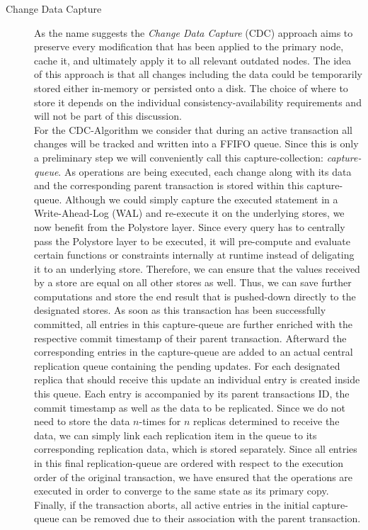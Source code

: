 \begin{description}
    \item [Change Data Capture]
     As the name suggests the \emph{Change Data Capture} (CDC) approach aims to preserve every modification that has been applied to the primary node, cache it, and ultimately
    apply it to all relevant outdated nodes. 
    The idea of this approach is that all changes including the data could be temporarily stored either in-memory or persisted onto a disk.
    The choice of where to store it depends on the individual consistency-availability requirements and will not be part of this discussion.\\
    For the CDC-Algorithm we consider that during an active transaction all changes will be tracked and written into a FFIFO queue.
    Since this is only a preliminary step we will conveniently call this capture-collection: \emph{capture-queue}.
    As operations are being executed, each change along with its data and the corresponding parent transaction is stored within this capture-queue.
    Although we could simply capture the executed statement in a Write-Ahead-Log (WAL) and re-execute it on the underlying stores, we now benefit from the Polystore layer.
    Since every query has to centrally pass the Polystore layer to be executed, it will pre-compute and evaluate certain functions or constraints internally at runtime instead of
    deligating it to an underlying store. Therefore, we can ensure that the values received by a store are equal on all other stores as well.
    Thus, we can save further computations and store the end result that is pushed-down directly
    to the designated stores. As soon as this transaction has been successfully committed, all entries in this capture-queue are further enriched with the respective commit timestamp of their parent transaction.
    Afterward the corresponding entries in the capture-queue are added to an actual central replication queue containing the pending updates.
    For each designated replica that should receive this update an individual entry is created inside this queue. 
    Each entry is accompanied by its parent transactions ID, the commit timestamp as well as the data to be replicated.
    Since we do not need to store the data $n$-times for $n$ replicas determined to receive the data, we can simply link each replication item in the queue to its 
    corresponding replication data, which is stored separately. 
    Since all entries in this final replication-queue are ordered with respect to the execution order of the original transaction,
    we have ensured that the operations are executed in order to converge to the same state as its primary copy.\\ 
    Finally, if the transaction aborts, all active entries in the initial capture-queue can be removed due to their association with the parent transaction.\\




\end{description}
